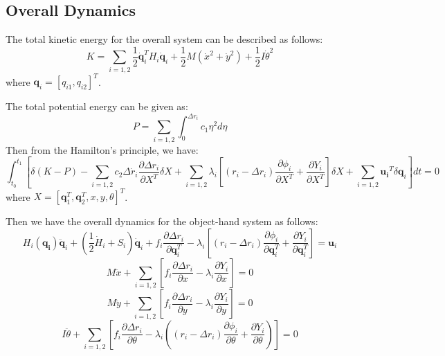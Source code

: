 \documentclass[]{article}
\begin{document}
\subsection{Overall Dynamics}
The total kinetic energy for the overall system can be described as follows:
\begin{equation}
K=\sum\limits_{i=1,2}\frac{1}{2}\mathbf{\dot{q}}_i^TH_i\mathbf{\dot{q}}_i+\frac{1}{2}
M(\dot{x}^2+\dot{y}^2)+\frac{1}{2}I\dot{\theta}^2
\end{equation}
where $\mathbf{q}_i=[q_{i1},q_{i2}]^T$.

The total potential energy can be given as:
\begin{equation}
P=\sum\limits_{i=1,2}\int_{0}^{\Delta r_i}c_1\eta^2d\eta
\end{equation}
Then from the Hamilton's principle, we have:
\begin{equation}
\int_{t_0}^{t_1}\left[\delta(K-P)-\sum\limits_{i=1,2}c_2\Delta \dot{r}_i
\frac{\partial\Delta r_i}{\partial X^T}\delta X + \sum\limits_{i=1,2}\lambda_i[(r_i-\Delta r_i)\frac{\partial\phi_i}{\partial X^T} + \frac{\partial Y_i}{\partial X^T}]\delta X +\sum\limits_{i=1,2}\mathbf{u_i}^T\delta \mathbf{q}_i\right]dt=0
\end{equation}
where $X=[\mathbf{q}_1^T,\mathbf{q}_2^T,x,y,\theta]^T$.

Then we have the overall dynamics for the object-hand system as follows:
\begin{equation}
H_i(\mathbf{q_i})\ddot{\mathbf{q}}_i+(\frac{1}{2}\dot{H}_i+S_i)\mathbf{\dot{q}}_i+f_i
\frac{\partial \Delta r_i}{\partial \mathbf{q}_i^T}-\lambda_i[(r_i-\Delta r_i)\frac{\partial\phi_i}{\partial \mathbf{q}_i^T} + \frac{\partial Y_i}{\partial \mathbf{q}_i^T}]=\mathbf{u}_i
\end{equation}
\begin{equation}
M\ddot{x}+\sum\limits_{i=1,2}[f_i\frac{\partial \Delta r_i}{\partial x}-\lambda_i
\frac{\partial Y_i}{\partial x}]=0
\end{equation}
\begin{equation}
M\ddot{y}+\sum\limits_{i=1,2}[f_i\frac{\partial \Delta r_i}{\partial y}-\lambda_i
\frac{\partial Y_i}{\partial y}]=0
\end{equation}
\begin{equation}
I\ddot{\theta}+\sum\limits_{i=1,2}[f_i\frac{\partial \Delta r_i}{\partial \theta}-\lambda_i((r_i-\Delta r_i)\frac{\partial\phi_i}{\partial \theta}+
\frac{\partial Y_i}{\partial \theta})]=0
\end{equation}
\end{document}
